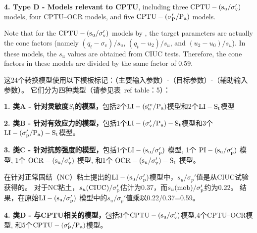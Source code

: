 \begin{Parallel}{0.60\textwidth}{}
{        \textbf{4. Type D - Models relevant to CPTU}, including three $\rm{CPTU}-(s_u/\sigma_v')$ models, four CPTU–OCR models, \quad and five $\rm{CPTU-(\sigma_P'/P_a)}$ models. 
        
        Note that for the $\rm{CPTU}-(s_u/\sigma_v')$ models by \citet{Ching201252}, the target parameters are actually the cone factors (namely $(q_t-\sigma_v)/s_u$, $(q_t-u_2)/s_u$, and $(u_2-u_0)/s_u$). In these models, the $s_u$ values are obtained from CIUC tests. Therefore, the cone factors in these models are divided by the same factor of 0.59.
    }
    \ParallelRText
    {
        这24个转换模型使用以下模板标记：（主要输入参数）-（目标参数）-（辅助输入参数）。 它们分为四种类型（请参见表\ ref {table：5}）：

        \textbf{1. 类A - 针对灵敏度$S_t$的模型，}包括2个$\rm{LI}-(s_u^{re}/P_a)$模型和2个$\rm{LI}-S_t$模型

        \textbf{2. 类B - 针对有效应力的模型，}包括1个$\rm{LI}-(\sigma_v'/P_a)-S_t$模型和3个$\rm{LI}-(\sigma_p'/P_a)-S_t$模型。

        \textbf{3. 类C - 针对抗剪强度的模型，}包括1个$\rm{LI}-(s_u/\sigma_p')$ 模型, 1个 $\rm{PI}-(s_u/\sigma_p')$ 模型, 1个 $\rm{OCR}-(s_u/\sigma_v')$ 模型, 和1个 $\rm{OCR}-(s_u/\sigma_v')-S_t$ 模型。

        在\citet{Bjerrum1960711}针对正常固结（NC）粘土提出的$\rm{LI}-(s_u/\sigma_p')$模型中，$s_u/\sigma_p'$值是从CIUC试验获得的。 对于NC粘土，$s_u(\rm{CIUC})/\sigma_p'$估计为0.37，而$s_u(\rm{mob})/\sigma_p'$约为0.22\citep{Mesri1975409}。 结果，\citet{Bjerrum1960711}在原始$\rm{LI}-(s_u/\sigma_p')$ 模型中的$s_u/\sigma_p'$值乘以0.22/0.37=0.59。

        \textbf{4. 类D - 与CPTU相关的模型，}包括3个$\rm{CPTU}-(s_u/\sigma_v')$模型,4个CPTU–OCR模型, 和5个$\rm{CPTU-(\sigma_P'/P_a)}$模型。

}
\end{Parallel}
